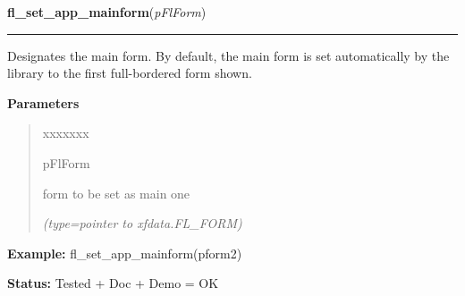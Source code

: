 \hspace{.8\funcindent}\begin{boxedminipage}{\funcwidth}

    \raggedright \textbf{fl\_set\_app\_mainform}(\textit{pFlForm})

    \vspace{-1.5ex}

    \rule{\textwidth}{0.5\fboxrule}
\setlength{\parskip}{2ex}
    Designates the main form. By default, the main form is set 
    automatically by the library to the first full-bordered form shown.

\setlength{\parskip}{1ex}
      \textbf{Parameters}
      \vspace{-1ex}

      \begin{quote}
        \begin{Ventry}{xxxxxxx}

          \item[pFlForm]

          form to be set as main one

            {\it (type=pointer to xfdata.FL\_FORM)}

        \end{Ventry}

      \end{quote}

\textbf{Example:} fl\_set\_app\_mainform(pform2)



\textbf{Status:} Tested + Doc + Demo = OK



    \end{boxedminipage}

    \label{xformslib:flbasic:fl_get_app_mainform}

    \vspace{0.5ex}

